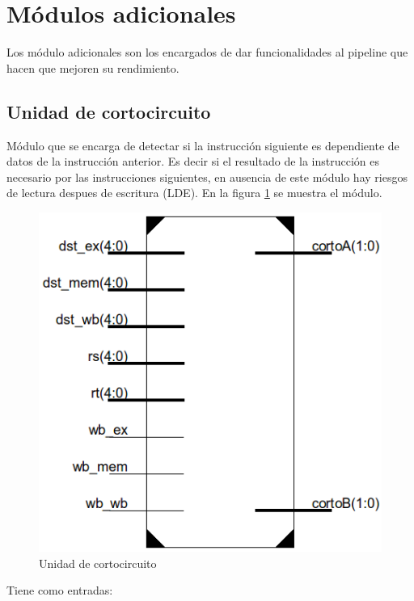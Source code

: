 \section{M\'odulos adicionales}
Los m\'odulo adicionales son los encargados de dar funcionalidades al pipeline que hacen que mejoren su rendimiento.
\subsection{Unidad de cortocircuito}
M\'odulo que se encarga de detectar si la instrucci\'on siguiente es dependiente de datos de la instrucci\'on anterior. Es decir si el resultado de la instrucci\'on es necesario por las instrucciones siguientes, en ausencia de este m\'odulo hay riesgos de lectura despues de escritura (LDE). En la figura \ref{fig:fwd} se muestra el m\'odulo.

\begin{figure}[H]
\centering
\includegraphics[scale=0.5]{img/forwarding}
\caption{Unidad de cortocircuito}
\label{fig:fwd}
\end{figure}

Tiene como entradas:

